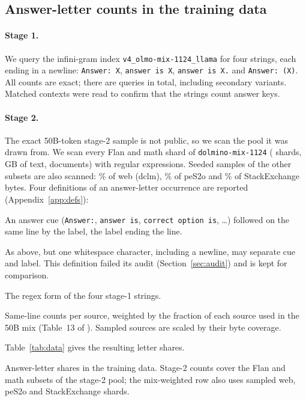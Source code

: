 \documentclass[11pt,a4paper]{article}
\begin{document}
\subsection{Answer-letter counts in the training data}
\paragraph{Stage 1.} We query the infini-gram index \texttt{v4\_olmo-mix-1124\_llama} for four strings, each ending in a newline: \texttt{Answer: X}, \texttt{answer is X}, \texttt{answer is X.} and \texttt{Answer: (X)}. All counts are exact; there are \NStageOneQueries{} queries in total, including secondary variants. Matched contexts were read to confirm that the strings count answer keys.

\paragraph{Stage 2.} The exact 50B-token stage-2 sample is not public, so we scan the pool it was drawn from. We scan every Flan and math shard of \texttt{dolmino-mix-1124} (\ScanShards{} shards, \ScanGB{}\,GB of text, \ScanDocs{} documents) with regular expressions. Seeded samples of the other subsets are also scanned: \CovDclm\% of web (dclm), \CovPes\% of peS2o and \CovSe\% of StackExchange bytes. Four definitions of an answer-letter occurrence are reported (Appendix~\ref{app:defs}):
\begin{description}[font=\normalfont\itshape]
\item[Same-line (primary).] An answer cue (\texttt{Answer:}, \texttt{answer is}, \texttt{correct option is}, \ldots) followed on the same line by the label, the label ending the line.
\item[Strict (as first locked).] As above, but one whitespace character, including a newline, may separate cue and label. This definition failed its audit (Section~\ref{sec:audit}) and is kept for comparison.
\item[Matched to stage 1.] The regex form of the four stage-1 strings.
\item[Mix-weighted.] Same-line counts per source, weighted by the fraction of each source used in the 50B mix (Table~13 of \citep{olmo2}). Sampled sources are scaled by their byte coverage.
\end{description}
Table~\ref{tab:data} gives the resulting letter shares.

\begin{table}[t]
\centering\small

\caption{Answer-letter shares in the training data. Stage-2 counts cover the Flan and math subsets of the stage-2 pool; the mix-weighted row also uses sampled web, peS2o and StackExchange shards.}\label{tab:data}
\end{table}
\end{document}
